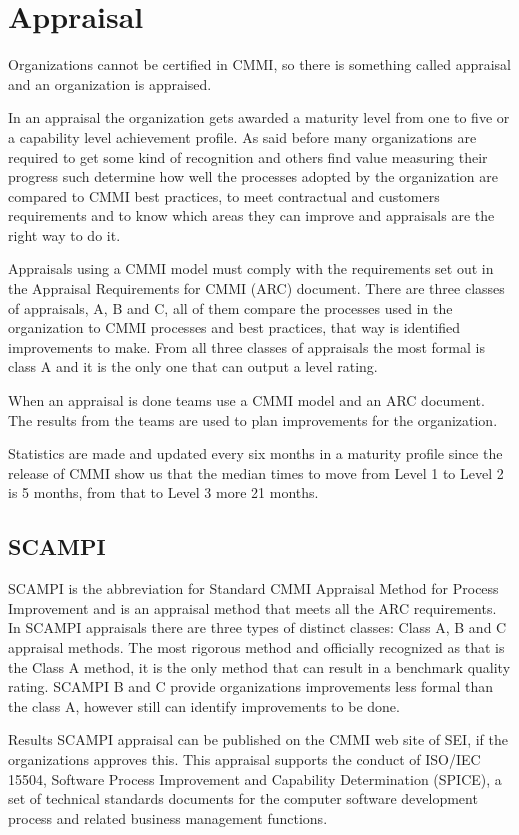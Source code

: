 \section{Appraisal}
Organizations cannot be certified in CMMI, so there is something called appraisal and an organization is appraised.

In an appraisal the organization gets awarded a maturity level from one to five or a capability level achievement profile. As said before many organizations are required to get some kind of recognition and others find value measuring their progress such determine how well the processes adopted by the organization are compared to CMMI best practices, to meet contractual and customers requirements and to know which areas they can improve and appraisals are the right way to do it.

Appraisals using a CMMI model must comply with the requirements set out in the Appraisal Requirements for CMMI (ARC) document. There are three classes of appraisals, A, B and C, all of them compare the processes used in the organization to CMMI processes and best practices, that way is identified improvements to make. From all three classes of appraisals the most formal is class A and it is the only one that can output a level rating.

When an appraisal is done teams use a CMMI model and an ARC document. The results from the teams are used to plan improvements for the organization.

Statistics are made and updated every six months in a maturity profile since the release of CMMI show us that the median times to move from Level 1 to Level 2 is 5 months, from that to Level 3 more 21 months.

\subsection{SCAMPI}
SCAMPI is the abbreviation for Standard CMMI Appraisal Method for Process Improvement and is an appraisal method that meets all the ARC requirements.
In SCAMPI appraisals there are three types of distinct classes: Class A, B and C appraisal methods. The most rigorous method and officially recognized as that is the Class A method, it is the only method that can result in a benchmark quality rating. SCAMPI B and C provide organizations improvements less formal than the class A, however still can identify improvements to be done.

Results SCAMPI appraisal can be published on the CMMI web site of SEI, if the organizations approves this. This appraisal supports the conduct of ISO/IEC 15504, Software Process Improvement and Capability Determination (SPICE), a set of technical standards documents for the computer software development process and related business management functions.

